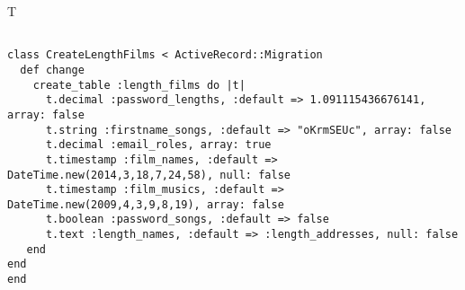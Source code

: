T
\begin{verbatim}
		
class CreateLengthFilms < ActiveRecord::Migration 
  def change 
    create_table :length_films do |t| 
      t.decimal :password_lengths, :default => 1.091115436676141, array: false
      t.string :firstname_songs, :default => "oKrmSEUc", array: false
      t.decimal :email_roles, array: true
      t.timestamp :film_names, :default => DateTime.new(2014,3,18,7,24,58), null: false
      t.timestamp :film_musics, :default => DateTime.new(2009,4,3,9,8,19), array: false
      t.boolean :password_songs, :default => false
      t.text :length_names, :default => :length_addresses, null: false
   end
end
end
\end{verbatim}
